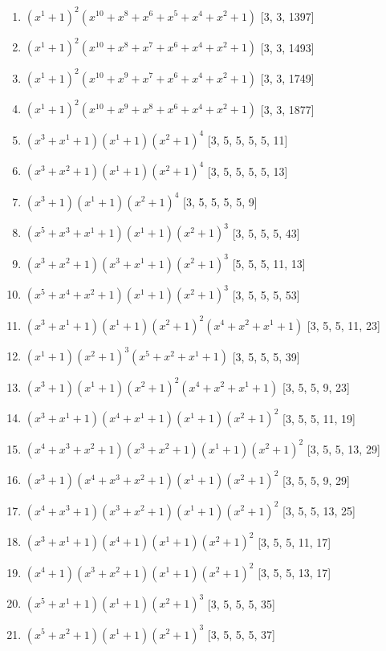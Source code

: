 \documentclass[10pt,twocolumn]{article}
\begin{document}
\begin{enumerate}
\item $(x^{1} + 1)^{2}(x^{10} + x^{8} + x^{6} + x^{5} + x^{4} + x^{2} + 1)$  [3, 3, 1397]
\item $(x^{1} + 1)^{2}(x^{10} + x^{8} + x^{7} + x^{6} + x^{4} + x^{2} + 1)$  [3, 3, 1493]
\item $(x^{1} + 1)^{2}(x^{10} + x^{9} + x^{7} + x^{6} + x^{4} + x^{2} + 1)$  [3, 3, 1749]
\item $(x^{1} + 1)^{2}(x^{10} + x^{9} + x^{8} + x^{6} + x^{4} + x^{2} + 1)$  [3, 3, 1877]
\item $(x^{3} + x^{1} + 1)(x^{1} + 1)(x^{2} + 1)^{4}$  [3, 5, 5, 5, 5, 11]
\item $(x^{3} + x^{2} + 1)(x^{1} + 1)(x^{2} + 1)^{4}$  [3, 5, 5, 5, 5, 13]
\item $(x^{3} + 1)(x^{1} + 1)(x^{2} + 1)^{4}$  [3, 5, 5, 5, 5, 9]
\item $(x^{5} + x^{3} + x^{1} + 1)(x^{1} + 1)(x^{2} + 1)^{3}$  [3, 5, 5, 5, 43]
\item $(x^{3} + x^{2} + 1)(x^{3} + x^{1} + 1)(x^{2} + 1)^{3}$  [5, 5, 5, 11, 13]
\item $(x^{5} + x^{4} + x^{2} + 1)(x^{1} + 1)(x^{2} + 1)^{3}$  [3, 5, 5, 5, 53]
\item $(x^{3} + x^{1} + 1)(x^{1} + 1)(x^{2} + 1)^{2}(x^{4} + x^{2} + x^{1} + 1)$  [3, 5, 5, 11, 23]
\item $(x^{1} + 1)(x^{2} + 1)^{3}(x^{5} + x^{2} + x^{1} + 1)$  [3, 5, 5, 5, 39]
\item $(x^{3} + 1)(x^{1} + 1)(x^{2} + 1)^{2}(x^{4} + x^{2} + x^{1} + 1)$  [3, 5, 5, 9, 23]
\item $(x^{3} + x^{1} + 1)(x^{4} + x^{1} + 1)(x^{1} + 1)(x^{2} + 1)^{2}$  [3, 5, 5, 11, 19]
\item $(x^{4} + x^{3} + x^{2} + 1)(x^{3} + x^{2} + 1)(x^{1} + 1)(x^{2} + 1)^{2}$  [3, 5, 5, 13, 29]
\item $(x^{3} + 1)(x^{4} + x^{3} + x^{2} + 1)(x^{1} + 1)(x^{2} + 1)^{2}$  [3, 5, 5, 9, 29]
\item $(x^{4} + x^{3} + 1)(x^{3} + x^{2} + 1)(x^{1} + 1)(x^{2} + 1)^{2}$  [3, 5, 5, 13, 25]
\item $(x^{3} + x^{1} + 1)(x^{4} + 1)(x^{1} + 1)(x^{2} + 1)^{2}$  [3, 5, 5, 11, 17]
\item $(x^{4} + 1)(x^{3} + x^{2} + 1)(x^{1} + 1)(x^{2} + 1)^{2}$  [3, 5, 5, 13, 17]
\item $(x^{5} + x^{1} + 1)(x^{1} + 1)(x^{2} + 1)^{3}$  [3, 5, 5, 5, 35]
\item $(x^{5} + x^{2} + 1)(x^{1} + 1)(x^{2} + 1)^{3}$  [3, 5, 5, 5, 37]

\end{enumerate}
\end{document}
